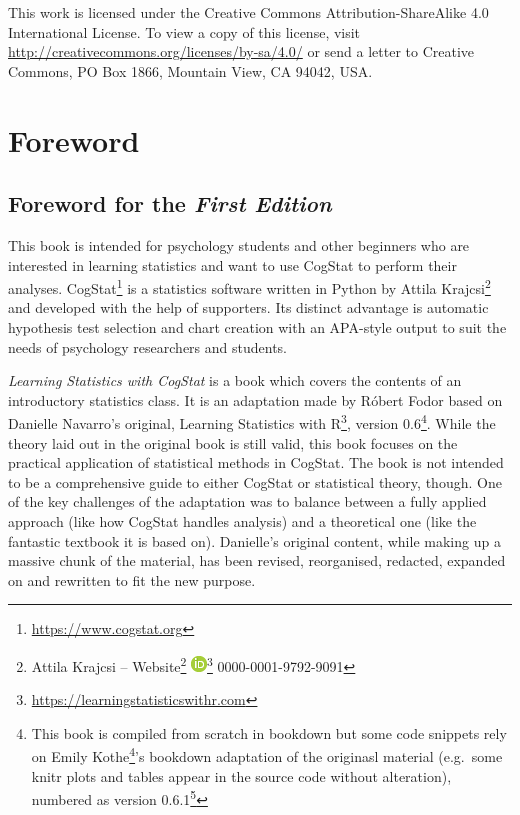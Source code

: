 \documentclass[
  11pt,
  a4paper,
  twoside,symmetric,openright]{book}
\theoremstyle{break}
\theoremstyle{break}
\DeclareRobustCommand{\href}[2]{#2\footnote{\url{#1}}}
\begin{document}
This work is licensed under the Creative Commons Attribution-ShareAlike 4.0 International License. To view a copy of this license, visit \url{http://creativecommons.org/licenses/by-sa/4.0/} or send a letter to Creative Commons, PO Box 1866, Mountain View, CA 94042, USA.

\hypertarget{foreword}{%
\chapter*{Foreword}\label{foreword}}

\hypertarget{foreword-for-the-first-edition}{%
\section*{\texorpdfstring{Foreword for the \emph{First Edition}}{Foreword for the First Edition}}\label{foreword-for-the-first-edition}}

This book is intended for psychology students and other beginners who are interested in learning statistics and want to use CogStat to perform their analyses. \href{https://www.cogstat.org}{CogStat} is a statistics software written in Python by Attila Krajcsi\footnote{Attila Krajcsi -- \href{http://www.attilakrajcsi.hu}{Website} \textbar{} \href{https://orcid.org/0000-0001-9792-9091}{\includegraphics{resources/image/orcid_16x16.png}} 0000-0001-9792-9091} and developed with the help of supporters. Its distinct advantage is automatic hypothesis test selection and chart creation with an APA-style output to suit the needs of psychology researchers and students.

\emph{Learning Statistics with CogStat} is a book which covers the contents of an introductory statistics class. It is an adaptation made by Róbert Fodor based on Danielle Navarro's original, \href{https://learningstatisticswithr.com}{Learning Statistics with R}, version 0.6\footnote{This book is compiled from scratch in bookdown but some code snippets rely on \href{https://twitter.com/emilyandthelime}{Emily Kothe}'s bookdown adaptation of the originasl material (e.g.~some knitr plots and tables appear in the source code without alteration), numbered as version \href{https://learningstatisticswithr.com/book/}{0.6.1}}. While the theory laid out in the original book is still valid, this book focuses on the practical application of statistical methods in CogStat. The book is not intended to be a comprehensive guide to either CogStat or statistical theory, though. One of the key challenges of the adaptation was to balance between a fully applied approach (like how CogStat handles analysis) and a theoretical one (like the fantastic textbook it is based on). Danielle's original content, while making up a massive chunk of the material, has been revised, reorganised, redacted, expanded on and rewritten to fit the new purpose.
\end{document}
